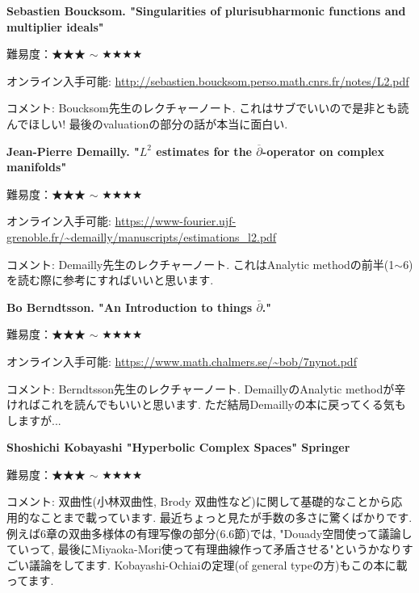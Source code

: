 \textbf{Sebastien Boucksom. "Singularities of plurisubharmonic functions and multiplier ideals"}  　\vspace{-6pt} 

難易度：★★★ $\sim$ ★★★★  　\vspace{-6pt} 

オンライン入手可能: \url{http://sebastien.boucksom.perso.math.cnrs.fr/notes/L2.pdf}\vspace{-6pt}

コメント: Boucksom先生のレクチャーノート. これはサブでいいので是非とも読んでほしい! 最後のvaluationの部分の話が本当に面白い. 
\vspace{8pt}

\textbf{Jean-Pierre Demailly. "$L^2$ estimates for the $\overline{\partial}$-operator on complex manifolds"}  　\vspace{-6pt} 

難易度：★★★ $\sim$ ★★★★  　\vspace{-6pt} 

オンライン入手可能: \url{https://www-fourier.ujf-grenoble.fr/~demailly/manuscripts/estimations_l2.pdf}\vspace{-6pt}

コメント: Demailly先生のレクチャーノート. これはAnalytic methodの前半(1$\sim$6)を読む際に参考にすればいいと思います. 
\vspace{8pt}

\textbf{Bo Berndtsson. "An Introduction to things $\bar\partial$."}  　\vspace{-6pt} 

難易度：★★★ $\sim$ ★★★★  　\vspace{-6pt} 

オンライン入手可能: \url{https://www.math.chalmers.se/~bob/7nynot.pdf}\vspace{-6pt}

コメント: Berndtsson先生のレクチャーノート. DemaillyのAnalytic methodが辛ければこれを読んでもいいと思います. ただ結局Demaillyの本に戻ってくる気もしますが...
\vspace{8pt}

\textbf{Shoshichi Kobayashi "Hyperbolic Complex Spaces" Springer}  　\vspace{-6pt} 

難易度：★★★ $\sim$ ★★★★  　\vspace{-6pt} 

コメント: 双曲性(小林双曲性, Brody 双曲性など)に関して基礎的なことから応用的なことまで載っています. 最近ちょっと見たが手数の多さに驚くばかりです. 例えば6章の双曲多様体の有理写像の部分(6.6節)では, "Douady空間使って議論していって, 最後にMiyaoka-Mori使って有理曲線作って矛盾させる"というかなりすごい議論をしてます. Kobayashi-Ochiaiの定理(of general typeの方)もこの本に載ってます.  

